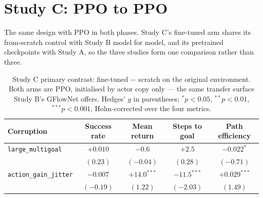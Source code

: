 \section{Study C: PPO to PPO}

The same design with PPO in both phases. Study C's fine-tuned arm shares
its from-scratch control with Study B model for model, and its pretrained
checkpoints with Study A, so the three studies form one comparison rather
than three.

\begin{table}[htbp]
\centering
\setlength{\tabcolsep}{4pt}
\caption{Study C primary contrast: fine-tuned $-$ scratch on the original
environment. Both arms are PPO, initialised by actor copy only --- the same
transfer surface Study B's GFlowNet offers. Hedges' $g$ in parentheses;
${}^{*}p<0.05$, ${}^{**}p<0.01$, ${}^{***}p<0.001$, Holm-corrected over the
four metrics.}
\small
\begin{tabular}{lcccc}
\toprule
Corruption & Success rate & Mean return & Steps to goal & Path efficiency \\
\midrule
\texttt{large\_multigoal} & $+0.010$ & $-0.6$ & $+2.5$ & $-0.022^{*}$ \\
 & \footnotesize$(0.23)$ & \footnotesize$(-0.04)$ & \footnotesize$(0.28)$ & \footnotesize$(-0.71)$ \\[3pt]
\texttt{action\_gain\_jitter} & $-0.007$ & $+14.0^{***}$ & $-11.5^{***}$ & $+0.029^{***}$ \\
 & \footnotesize$(-0.19)$ & \footnotesize$(1.22)$ & \footnotesize$(-2.03)$ & \footnotesize$(1.49)$ \\[3pt]
\bottomrule
\end{tabular}
\end{table}

